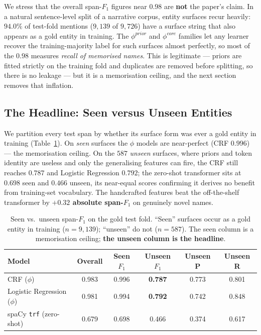 \documentclass[conference]{IEEEtran}
\begin{document}
We stress that the overall span-$F_1$ figures near $0.98$ are \textbf{not} the paper's claim. In a natural sentence-level split of a narrative corpus, entity surfaces recur heavily: $94.0\%$ of test-fold mentions ($9{,}139$ of $9{,}726$) have a surface string that also appears as a gold entity in training. The $\phi^{prior}$ and $\phi^{core}$ families let any learner recover the training-majority label for such surfaces almost perfectly, so most of the $0.98$ measures \emph{recall of memorised names}. This is legitimate --- priors are fitted strictly on the training fold and duplicates are removed before splitting, so there is no leakage --- but it is a memorisation ceiling, and the next section removes that inflation.

\subsection{The Headline: Seen versus Unseen Entities}
\label{sec:seenunseen}

We partition every test span by whether its surface form was ever a gold entity in training (Table~\ref{tab:seenunseen}). On \emph{seen} surfaces the $\phi$ models are near-perfect (CRF $0.996$) --- the memorisation ceiling. On the $587$ \emph{unseen} surfaces, where priors and token identity are useless and only the generalising features can fire, the CRF still reaches $0.787$ and Logistic Regression $0.792$; the zero-shot transformer sits at $0.698$ seen and $0.466$ unseen, its near-equal scores confirming it derives no benefit from training-set vocabulary. The handcrafted features beat the off-the-shelf transformer by \textbf{$+0.32$ absolute span-$F_1$} on genuinely novel names.

\begin{table}[!t]
\centering
\caption{Seen vs.\ unseen span-$F_1$ on the gold test fold. ``Seen'' surfaces occur as a gold entity in training ($n=9{,}139$); ``unseen'' do not ($n=587$). The seen column is a memorisation ceiling; \textbf{the unseen column is the headline}.}
\label{tab:seenunseen}
\small
\begin{tabular}{@{}l c c c c c@{}}
\toprule
\textbf{Model} & \textbf{Overall} & \textbf{Seen} $F_1$ & \textbf{Unseen} $F_1$ & \textbf{Unseen P} & \textbf{Unseen R} \\
\midrule
CRF ($\phi$)                 & 0.983 & 0.996 & \textbf{0.787} & 0.773 & 0.801 \\
Logistic Regression ($\phi$) & 0.981 & 0.994 & \textbf{0.792} & 0.742 & 0.848 \\
spaCy \texttt{trf} (zero-shot)& 0.679 & 0.698 & 0.466 & 0.374 & 0.617 \\
\bottomrule
\end{tabular}
\end{table}
\end{document}
